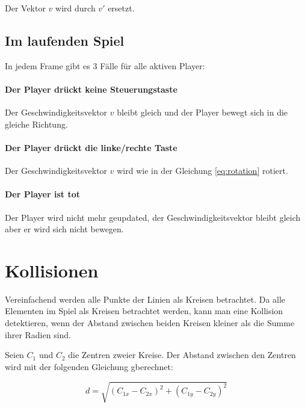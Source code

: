 \documentclass[doktyp=studarbeit]{TUBAFarbeiten}
\begin{document}
Der Vektor $v$ wird durch $v'$ ersetzt.

\subsection{Im laufenden Spiel}
In jedem Frame gibt es 3 Fälle für alle aktiven Player:

\paragraph{Der Player drückt keine Steuerungstaste}
Der Geschwindigkeitsvektor $v$ bleibt gleich und der Player bewegt sich
in die gleiche Richtung.

\paragraph{Der Player drückt die linke/rechte Taste}
Der Geschwindigkeitsvektor $v$ wird wie in der Gleichung \ref{eq:rotation}
rotiert.

\paragraph{Der Player ist tot}
Der Player wird nicht mehr geupdated, der Geschwindigkeitsvektor bleibt gleich
aber er wird sich nicht bewegen.

\section{Kollisionen}

Vereinfachend werden alle Punkte der Linien als Kreisen betrachtet.
Da alle Elementen im Spiel als Kreisen betrachtet werden, kann man eine Kollision
detektieren, wenn der Abstand zwischen beiden Kreisen kleiner als die Summe ihrer Radien sind.

Seien $C_{1}$ und $C_{2}$ die Zentren zweier Kreise. Der Abstand zwischen den 
Zentren wird mit der folgenden Gleichung gberechnet:

\begin{equation}
    d = \sqrt{(C_{1x} - C_{2x})^2 + (C_{1y} - C_{2y})^2}
\end{equation}
\end{document}
